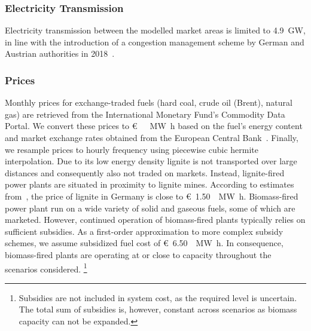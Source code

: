 \documentclass[review, 3p, times, 12pt]{elsarticle} %
\begin{document}
\subsubsection{Electricity Transmission}
Electricity transmission between the modelled market areas is limited to \SI{4.9}{\giga\watt}, in line with the introduction of a congestion management scheme by German and Austrian authorities in 2018~\citep{}.

\subsubsection{Prices}
Monthly prices for exchange-traded fuels (hard coal, crude oil (Brent), natural gas) are retrieved from the
International Monetary Fund's Commodity Data Portal.
We convert these prices to \SI[sticky-per]{}[\euro]{\per\mega\watt\hour} based on the fuel's energy content and market exchange rates obtained from the European Central Bank~\citep{ECB2020}.
Finally, we resample prices to hourly frequency using piecewise cubic hermite interpolation.
Due to its low energy density lignite is not transported over large distances and consequently also not traded on
markets.
Instead, lignite-fired power plants are situated in proximity to lignite mines.
According to estimates from~\cite{OekoInstitut2017}, the price of lignite in Germany is close to
\SI[sticky-per]{1.50}[\euro]{\per\mega\watt\hour}.
Biomass-fired power plant run on a wide variety of solid and gaseous fuels, some of which are marketed.
However, continued operation of biomass-fired plants typically relies on sufficient subsidies.
As a first-order approximation to more complex subsidy schemes, we assume subsidized fuel cost of
\SI[sticky-per]{6.50}[\euro]{\per\mega\watt\hour}.
In consequence, biomass-fired plants are operating at or close to capacity throughout the scenarios considered.
\footnote{Subsidies are not included in system cost, as the required level is uncertain.
The total sum of subsidies is, however, constant across scenarios as biomass capacity can not be expanded.}
\end{document}
